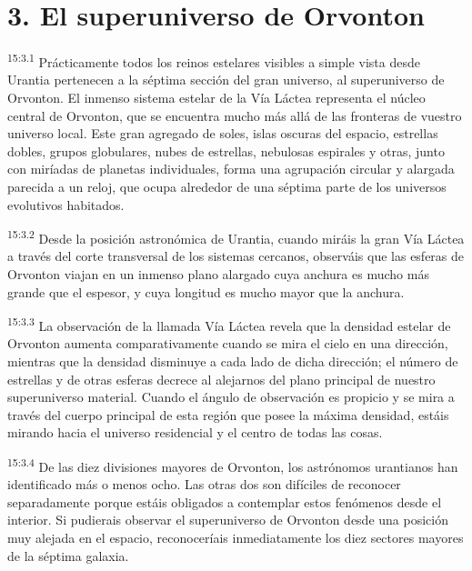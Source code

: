 \section*{3. El superuniverso de Orvonton}
\par
\textsuperscript{15:3.1} Prácticamente todos los reinos estelares visibles a simple vista desde Urantia pertenecen a la séptima sección del gran universo, al superuniverso de Orvonton. El inmenso sistema estelar de la Vía Láctea representa el núcleo central de Orvonton, que se encuentra mucho más allá de las fronteras de vuestro universo local. Este gran agregado de soles, islas oscuras del espacio, estrellas dobles, grupos globulares, nubes de estrellas, nebulosas espirales y otras, junto con miríadas de planetas individuales, forma una agrupación circular y alargada parecida a un reloj, que ocupa alrededor de una séptima parte de los universos evolutivos habitados.

\par
\textsuperscript{15:3.2} Desde la posición astronómica de Urantia, cuando miráis la gran Vía Láctea a través del corte transversal de los sistemas cercanos, observáis que las esferas de Orvonton viajan en un inmenso plano alargado cuya anchura es mucho más grande que el espesor, y cuya longitud es mucho mayor que la anchura.

\par
\textsuperscript{15:3.3} La observación de la llamada Vía Láctea revela que la densidad estelar de Orvonton aumenta comparativamente cuando se mira el cielo en una dirección, mientras que la densidad disminuye a cada lado de dicha dirección; el número de estrellas y de otras esferas decrece al alejarnos del plano principal de nuestro superuniverso material. Cuando el ángulo de observación es propicio y se mira a través del cuerpo principal de esta región que posee la máxima densidad, estáis mirando hacia el universo residencial y el centro de todas las cosas.

\par
\textsuperscript{15:3.4} De las diez divisiones mayores de Orvonton, los astrónomos urantianos han identificado más o menos ocho. Las otras dos son difíciles de reconocer separadamente porque estáis obligados a contemplar estos fenómenos desde el interior. Si pudierais observar el superuniverso de Orvonton desde una posición muy alejada en el espacio, reconoceríais inmediatamente los diez sectores mayores de la séptima galaxia.


